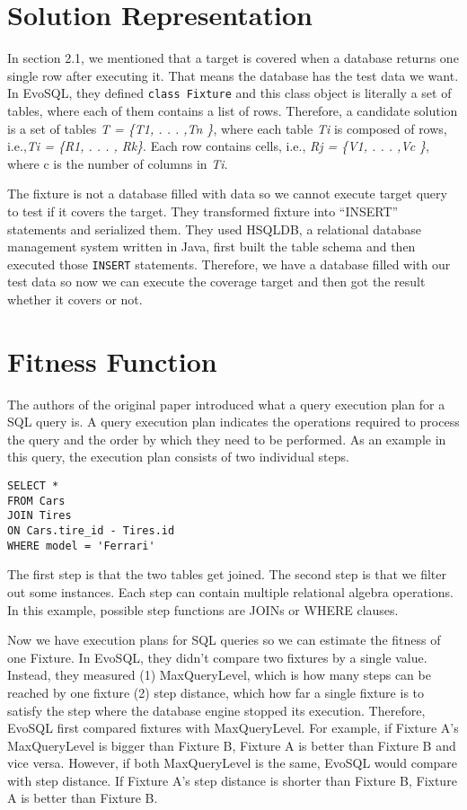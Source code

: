 \section{Solution Representation}
In section 2.1, we mentioned that a target is covered when a database returns one single row after executing it. That means the database has the test data we want. In EvoSQL, they defined \verb|class Fixture| and this class object is literally a set of tables, where each of them contains a list of rows. Therefore, a candidate solution is a set of tables \textit{T = \{T1, . . . ,Tn \}}, where each table \textit{Ti} is composed of rows, i.e.,\textit{Ti = \{R1, . . . , Rk\}}. Each row contains cells, i.e., \textit{Rj = \{V1, . . . ,Vc \}}, where c is the number of columns in \textit{Ti}. 

The fixture is not a database filled with data so we cannot execute target query to test if it covers the target. They transformed fixture into “INSERT” statements and serialized them. They used HSQLDB, a relational database management system written in Java, first built the table schema and then executed those \verb|INSERT| statements. Therefore, we have a database filled with our test data so now we can execute the coverage target and then got the result whether it covers or not.

\section{Fitness Function}
The authors of the original paper introduced what a query execution plan for a SQL query is. A query execution plan indicates the operations required to process the query and the order by which they need to be performed. As an example in this query, the execution plan consists of two individual steps.

\begin{center}
\begin{BVerbatim}
SELECT * 
FROM Cars
JOIN Tires
ON Cars.tire_id - Tires.id
WHERE model = 'Ferrari'
\end{BVerbatim}
\end{center}

The first step is that the two tables get joined. The second step is that we filter out some instances. Each step can contain multiple relational algebra operations. In this example, possible step functions are JOINs or WHERE clauses.

Now we have execution plans for SQL queries so we can estimate the fitness of one Fixture. In EvoSQL, they didn't compare two fixtures by a single value. Instead, they measured (1) MaxQueryLevel, which is how many steps can be reached by one fixture (2) step distance, which how far a single fixture is to satisfy the step where the database engine stopped its execution. Therefore, EvoSQL first compared fixtures with MaxQueryLevel. For example, if Fixture A's MaxQueryLevel is bigger than Fixture B, Fixture A is better than Fixture B and vice versa. However, if both MaxQueryLevel is the same, EvoSQL would compare with step distance. If Fixture A's step distance is shorter than Fixture B, Fixture A is better than Fixture B. 
